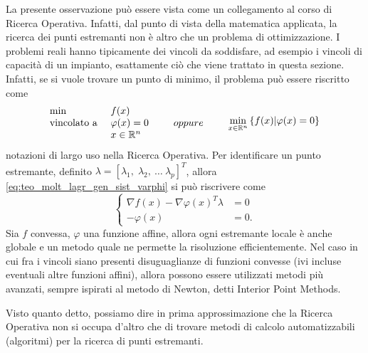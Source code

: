 \cbstart
\begin{observation}
	La presente osservazione può essere vista come un collegamento al corso di Ricerca Operativa.
	Infatti, dal punto di vista della matematica applicata, la ricerca dei punti estremanti non è altro che un problema di ottimizzazione.
	I problemi reali hanno tipicamente dei vincoli da soddisfare, ad esempio i vincoli di capacità di un impianto, esattamente ciò che viene trattato in questa sezione.
	Infatti, se si vuole trovare un punto di minimo, il problema può essere riscritto come
	\[
		\begin{array}{ll}
			\min &f(x)\\
			\text{vincolato a } &\varphi(x) = 0\\
			& x \in \mathbb{R}^n
		\end{array}
		\qquad oppure \qquad
		\begin{array}{c}
			\displaystyle\min_{x \in \mathbb{R}^n} \left\{f(x) | \varphi(x) = 0\right\}
		\end{array}
	\]
	notazioni di largo uso nella Ricerca Operativa.
	Per identificare un punto estremante, definito $\lambda = [ \lambda_1,\; \lambda_2,\:\dotsc\:\lambda_p ]^T$, allora \ref{eq:teo_molt_lagr_gen_sist_varphi} si può riscrivere come
	\[
		\begin{cases}
			\nabla f(x) - \nabla \varphi (x)^T \lambda &= 0\\
			-\varphi (x) &= 0.
		\end{cases}
	\]
	Sia $f$ convessa, $\varphi$ una funzione affine, allora ogni estremante locale è anche globale e un metodo quale  ne permette la risoluzione efficientemente.
	Nel caso in cui fra i vincoli siano presenti disuguaglianze di funzioni convesse (ivi incluse eventuali altre funzioni affini), allora possono essere utilizzati metodi più avanzati, sempre ispirati al metodo di Newton, detti Interior Point Methods.

	Visto quanto detto, possiamo dire in prima approssimazione che la Ricerca Operativa non si occupa d'altro che di trovare metodi di calcolo automatizzabili (algoritmi) per la ricerca di punti estremanti.
\end{observation}
\cbend

